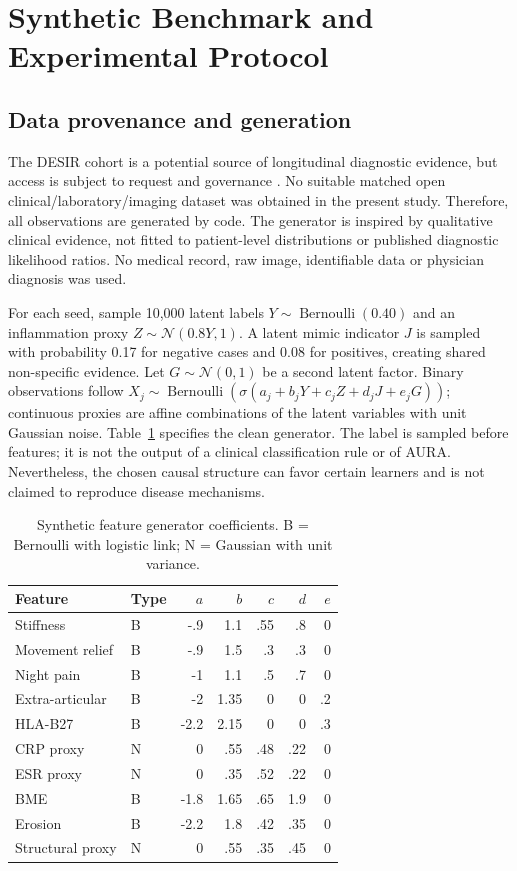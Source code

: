 \documentclass[conference]{IEEEtran}
\begin{document}
\section{Synthetic Benchmark and Experimental Protocol}
\subsection{Data provenance and generation}
The DESIR cohort is a potential source of longitudinal diagnostic evidence, but access is subject to request and governance \cite{desir}. No suitable matched open clinical/laboratory/imaging dataset was obtained in the present study. Therefore, all observations are generated by code. The generator is inspired by qualitative clinical evidence, not fitted to patient-level distributions or published diagnostic likelihood ratios. No medical record, raw image, identifiable data or physician diagnosis was used.

For each seed, sample 10,000 latent labels $Y\sim\operatorname{Bernoulli}(0.40)$ and an inflammation proxy $Z\sim\mathcal N(0.8Y,1)$. A latent mimic indicator $J$ is sampled with probability 0.17 for negative cases and 0.08 for positives, creating shared non-specific evidence. Let $G\sim\mathcal N(0,1)$ be a second latent factor. Binary observations follow $X_j\sim\operatorname{Bernoulli}(\sigma(a_j+b_jY+c_jZ+d_jJ+e_jG))$; continuous proxies are affine combinations of the latent variables with unit Gaussian noise. Table~\ref{tab:coeff} specifies the clean generator. The label is sampled before features; it is not the output of a clinical classification rule or of AURA. Nevertheless, the chosen causal structure can favor certain learners and is not claimed to reproduce disease mechanisms.
\begin{table}[t]
\caption{Synthetic feature generator coefficients. B = Bernoulli with logistic link; N = Gaussian with unit variance.}
\label{tab:coeff}
\centering\footnotesize
\begin{tabular}{@{}llrrrrr@{}}\toprule
Feature & Type & $a$ & $b$ & $c$ & $d$ & $e$\\\midrule
Stiffness & B & -.9 & 1.1 & .55 & .8 & 0\\
Movement relief & B & -.9 & 1.5 & .3 & .3 & 0\\
Night pain & B & -1 & 1.1 & .5 & .7 & 0\\
Extra-articular & B & -2 & 1.35 & 0 & 0 & .2\\
HLA-B27 & B & -2.2 & 2.15 & 0 & 0 & .3\\
CRP proxy & N & 0 & .55 & .48 & .22 & 0\\
ESR proxy & N & 0 & .35 & .52 & .22 & 0\\
BME & B & -1.8 & 1.65 & .65 & 1.9 & 0\\
Erosion & B & -2.2 & 1.8 & .42 & .35 & 0\\
Structural proxy & N & 0 & .55 & .35 & .45 & 0\\\bottomrule
\end{tabular}
\end{table}
\end{document}
